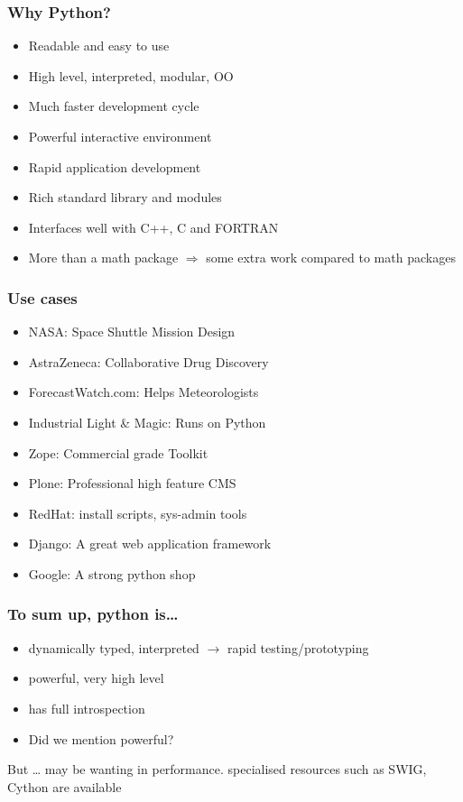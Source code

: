 \documentclass[14pt,compress]{beamer}
\newcounter{time}
\newcommand{\inctime}[1]{\addtocounter{time}{#1}{\tiny \thetime\ m}}
\begin{document}
\begin{frame}
  \frametitle{Why Python?}
  \begin{itemize}
  \item Readable and easy to use
  \item High level, interpreted, modular, OO
  \item Much faster development cycle
  \item Powerful interactive environment
  \item Rapid application development
  \item Rich standard library and modules
  \item Interfaces well with C++, C and FORTRAN
  \item \alert{More than a math package $\Rightarrow$ some extra work compared to math packages}
  \end{itemize}
\end{frame}

\begin{frame}
  \frametitle{Use cases}
  \begin{itemize}
  \item NASA: Space Shuttle Mission Design
  \item AstraZeneca: Collaborative Drug Discovery
  \item ForecastWatch.com: Helps Meteorologists
  \item Industrial Light \& Magic: Runs on Python
  \item Zope: Commercial grade Toolkit
  \item Plone: Professional high feature CMS
  \item RedHat: install scripts, sys-admin tools
  \item Django: A great web application framework
  \item Google: A strong python shop
  \end{itemize}
\end{frame}

\begin{frame}
  \frametitle{To sum up, python is\ldots}
  \begin{itemize}
  \item dynamically typed, interpreted $\rightarrow$ rapid testing/prototyping
  \item powerful, very high level
  \item has full introspection 
  \item Did we mention powerful?
  \end{itemize}
  \begin{block}{But \ldots}
    may be wanting in performance. specialised resources such as SWIG, \alert{Cython} are available 
  \end{block}
  \inctime{15}
\end{frame}
\end{document}
